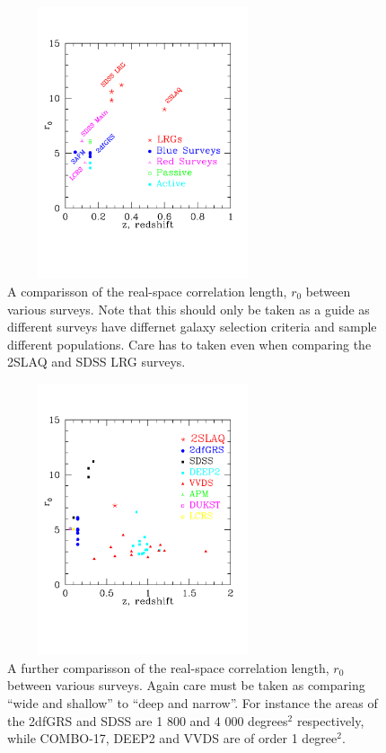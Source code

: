 \documentclass[usenatbib]{mn2e}
\begin{document}
\begin{figure}
  \includegraphics[height=8.0cm,width=8.0cm]
                  {pdf/r_nought_z_labels.pdf}
  \centering
  \caption[A comparisson of the real-space correlation length, $r_{0}$ between various surveys]
          {A comparisson of the real-space correlation length, $r_{0}$ between various surveys. 
           Note that this should only be taken as a guide 
           as different surveys have differnet galaxy selection criteria 
           and sample different populations. 
           Care has to taken even when comparing the 2SLAQ and SDSS LRG surveys.}
  \label{fig:r_nought_z_labels}
\end{figure}


\begin{figure}
  \includegraphics[height=8.0cm,width=8.0cm]{pdf/r_nought_z.pdf}
  \centering
  \caption{A further comparisson of the real-space correlation length, 
    $r_{0}$ between various surveys. 
    Again care must be taken as comparing ``wide and shallow'' to ``deep and
    narrow''. For instance the areas of the 2dfGRS and SDSS 
    are 1 800 and 4 000 degrees$^{2}$ respectively, while COMBO-17, 
    DEEP2 and VVDS are of order 1 degree$^{2}$.}
  \label{fig:r_nought_z}
\end{figure}
\end{document}
